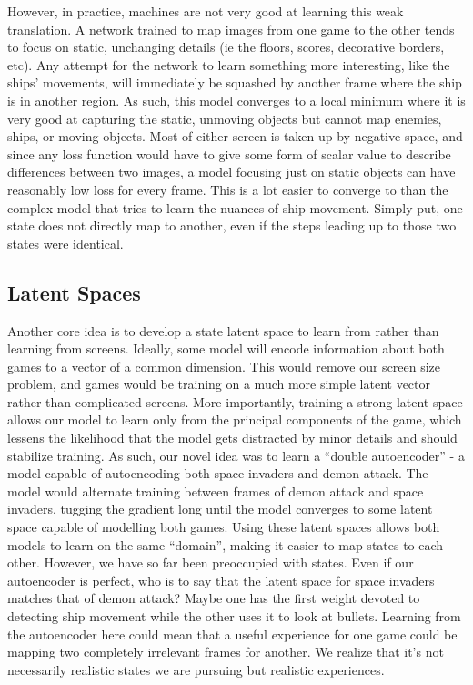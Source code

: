 \documentclass{article} %
\begin{document}
However, in practice, machines are not very good at learning this weak translation. A network
trained to map images from one game to the other tends to focus on static, unchanging details (ie
the floors, scores, decorative borders, etc). Any attempt for the network to learn something more
interesting, like the ships' movements, will immediately be squashed by another frame where the ship
is in another region.  As such, this model converges to a local minimum where it is very good at
capturing the static, unmoving objects but cannot map enemies, ships, or moving objects. Most of
either screen is taken up by negative space, and since any loss function would have to give some
form of scalar value to describe differences between two images, a model focusing just on static
objects can have reasonably low loss for every frame. This is a lot easier to converge to than the
complex model that tries to learn the nuances of ship movement. Simply put, one state does not
directly map to another, even if the steps leading up to those two states were identical.

\subsection{Latent Spaces}
Another core idea is to develop a state latent space to learn from rather than learning from
screens. Ideally, some model will encode information about both games to a vector of a common
dimension. This would remove our screen size problem, and games would be training on a much more
simple latent vector rather than complicated screens. More importantly, training a strong latent
space allows our model to learn only from the principal components of the game, which lessens the
likelihood that the model gets distracted by minor details and should stabilize training. As such,
our novel idea was to learn a ``double autoencoder'' - a model capable of autoencoding both space
invaders and demon attack. The model would alternate training between frames of demon attack and
space invaders, tugging the gradient long until the model converges to some latent space capable of
modelling both games. Using these latent spaces allows both models to learn on the same “domain”,
making it easier to map states to each other. However, we have so far been preoccupied with states.
Even if our autoencoder is perfect, who is to say that the latent space for space invaders matches
that of demon attack? Maybe one has the first weight devoted to detecting ship movement while the
other uses it to look at bullets. Learning from the autoencoder here could mean that a useful
experience for one game could be mapping two completely irrelevant frames for another. We realize
that it's not necessarily realistic states we are pursuing but realistic experiences.
\end{document}
